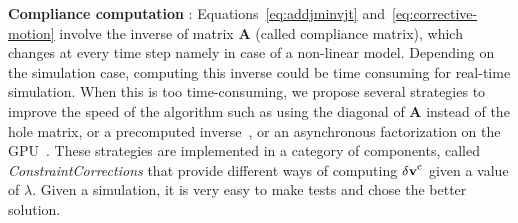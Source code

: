 \textbf{Compliance computation} : Equations~\ref{eq:addjminvjt} and~\ref{eq:corrective-motion} involve the inverse of matrix $\mathbf{A}$ (called compliance matrix), which changes at every time step namely in case of a non-linear model. 
Depending on the simulation case, computing this inverse could be time consuming for real-time simulation. 
When this is too time-consuming, we propose several strategies to improve the speed of the algorithm such as using the diagonal of $\mathbf{A}$ instead of the hole matrix, or a precomputed inverse~\cite{Saupin08}, or an asynchronous factorization on the GPU~\cite{CourtecuisseMICCAI11}.  
These strategies are implemented in a category of components, called  \textit{ConstraintCorrections} that provide different ways of computing $\mathbf{\delta\mathbf{v } }^{\mathrm{c}}$ given a value of $\lambda$. Given a simulation, it is very easy to make tests and chose the better solution.




